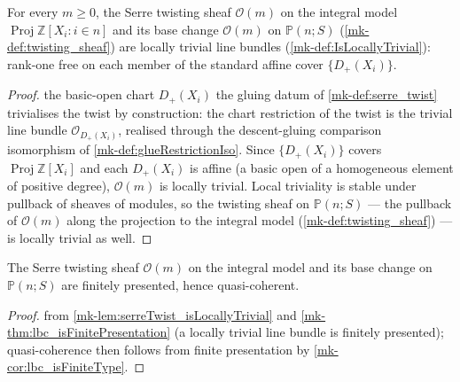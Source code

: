 \begin{lemma}\label{mk-lem:serreTwist_isLocallyTrivial}
  \leanok

  For every \(m \ge 0\), the Serre twisting sheaf \(\mathcal{O}(m)\) on
  the integral model \(\operatorname{Proj} \mathbb{Z}[X_i : i \in n]\)
  and its base change \(\mathcal{O}(m)\) on \(\mathbb{P}(n; S)\)
  (\ref{mk-def:twisting_sheaf}) are locally trivial line bundles
  (\ref{mk-def:IsLocallyTrivial}): rank-one free on each member of the
  standard affine cover \(\{D_+(X_i)\}\).
\end{lemma}
\begin{proof}
  \leanokOn the basic-open chart \(D_+(X_i)\) the gluing datum of
  \ref{mk-def:serre_twist} trivialises the twist by construction: the
  chart restriction of the twist is the trivial line bundle
  \(\mathcal{O}_{D_+(X_i)}\), realised through the descent-gluing
  comparison isomorphism of \ref{mk-def:glueRestrictionIso}. Since
  \(\{D_+(X_i)\}\) covers \(\operatorname{Proj} \mathbb{Z}[X_i]\) and
  each \(D_+(X_i)\) is affine (a basic open of a homogeneous element of
  positive degree), \(\mathcal{O}(m)\) is locally trivial. Local
  triviality is stable under pullback of sheaves of modules, so the
  twisting sheaf on \(\mathbb{P}(n; S)\) --- the pullback of
  \(\mathcal{O}(m)\) along the projection to the integral model
  (\ref{mk-def:twisting_sheaf}) --- is locally trivial as well.
\end{proof}

\begin{corollary}\label{mk-cor:serreTwist_isFinitePresentation}
  \leanok

  The Serre twisting sheaf \(\mathcal{O}(m)\) on the integral model and
  its base change on \(\mathbb{P}(n; S)\) are finitely presented, hence
  quasi-coherent.
\end{corollary}
\begin{proof}
  \leanokImmediate from \ref{mk-lem:serreTwist_isLocallyTrivial} and
  \ref{mk-thm:lbc_isFinitePresentation} (a locally trivial line bundle is
  finitely presented); quasi-coherence then follows from finite
  presentation by \ref{mk-cor:lbc_isFiniteType}.
\end{proof}


